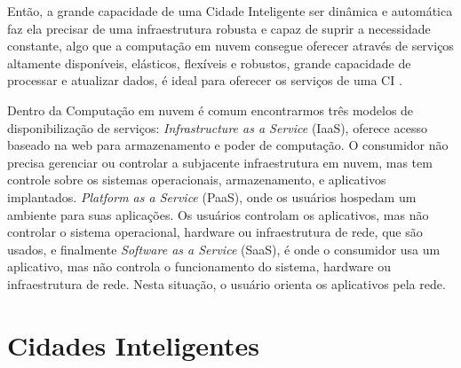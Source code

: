Então, a grande capacidade de uma Cidade Inteligente ser dinâmica e automática faz ela precisar de uma infraestrutura robusta e capaz de suprir a necessidade constante, algo que a computação em nuvem consegue oferecer através de serviços altamente disponíveis, elásticos, flexíveis e robustos, grande capacidade de processar e atualizar dados, é ideal para oferecer os serviços de uma CI \cite{kon-cloud}.

Dentro da Computação em nuvem é comum encontrarmos três modelos de disponibilização de serviços: \textit{Infrastructure as a Service} (IaaS), oferece acesso baseado na web para armazenamento e poder de computação. O consumidor não precisa gerenciar ou controlar a subjacente infraestrutura em nuvem, mas tem controle sobre os sistemas operacionais, armazenamento, e aplicativos implantados.
\textit{Platform as a Service} (PaaS), onde os usuários hospedam um
ambiente para suas aplicações. Os usuários controlam os aplicativos, mas não controlar o sistema operacional, hardware ou infraestrutura de rede, que são usados, e finalmente \textit{Software as a Service} (SaaS), é onde o consumidor usa um aplicativo, mas não controla o funcionamento do sistema, hardware ou infraestrutura de rede. Nesta situação, o usuário orienta os aplicativos pela rede. 

\section{Cidades Inteligentes}


